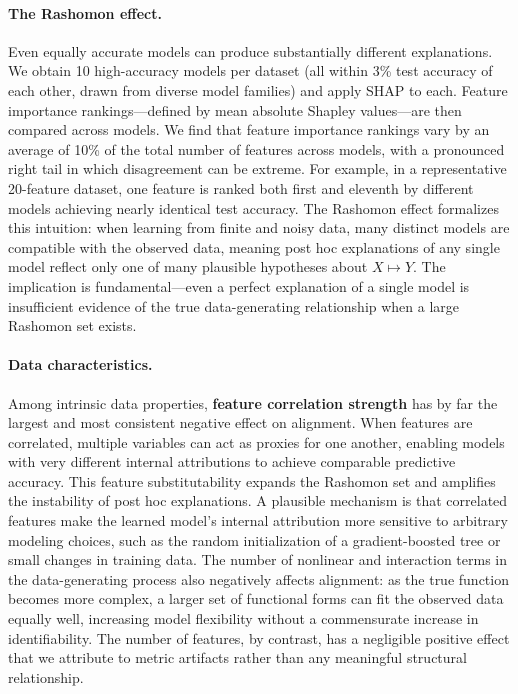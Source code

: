 \documentclass[11pt]{article}
\begin{document}
\paragraph{The Rashomon effect.}
Even equally accurate models can produce substantially different explanations. We obtain 10 high-accuracy models per dataset (all within 3\% test accuracy of each other, drawn from diverse model families) and apply SHAP to each. Feature importance rankings---defined by mean absolute Shapley values---are then compared across models. We find that feature importance rankings vary by an average of 10\% of the total number of features across models, with a pronounced right tail in which disagreement can be extreme. For example, in a representative 20-feature dataset, one feature is ranked both first and eleventh by different models achieving nearly identical test accuracy. The Rashomon effect \citep{semenova22rashomon, paes23inevitable} formalizes this intuition: when learning from finite and noisy data, many distinct models are compatible with the observed data, meaning post hoc explanations of any single model reflect only one of many plausible hypotheses about $X \mapsto Y$. The implication is fundamental---even a perfect explanation of a single model is insufficient evidence of the true data-generating relationship when a large Rashomon set exists.
\vspace{-0.5cm}
\paragraph{Data characteristics.}
Among intrinsic data properties, \textbf{feature correlation strength} has by far the largest and most consistent negative effect on alignment. When features are correlated, multiple variables can act as proxies for one another, enabling models with very different internal attributions to achieve comparable predictive accuracy. This feature substitutability expands the Rashomon set and amplifies the instability of post hoc explanations. A plausible mechanism is that correlated features make the learned model's internal attribution more sensitive to arbitrary modeling choices, such as the random initialization of a gradient-boosted tree or small changes in training data. The number of nonlinear and interaction terms in the data-generating process also negatively affects alignment: as the true function becomes more complex, a larger set of functional forms can fit the observed data equally well, increasing model flexibility without a commensurate increase in identifiability. The number of features, by contrast, has a negligible positive effect that we attribute to metric artifacts rather than any meaningful structural relationship.
\end{document}
